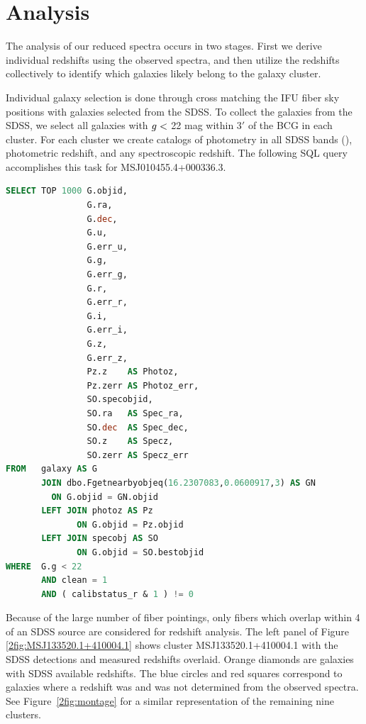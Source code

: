 \section{Analysis}\label{2sec:analysis} 
The analysis of our reduced spectra occurs in two stages. First we derive individual redshifts using the observed spectra, and then utilize the redshifts collectively to identify which galaxies likely belong to the galaxy cluster.

Individual galaxy selection is done through cross matching the IFU fiber sky positions with galaxies selected from the SDSS. To collect the galaxies from the SDSS, we select all galaxies with $\hbox{$g$} <$ 22 mag within $3'$ of the BCG in each cluster. For each cluster we create catalogs of photometry in all SDSS bands (\sdssu\sdssg\sdssr\sdssi\sdssz), photometric redshift, and any spectroscopic redshift. The following SQL query accomplishes this task for MSJ010455.4+000336.3.
\begin{singlespace}
\begin{lstlisting}[language=SQL]
SELECT TOP 1000 G.objid, 
                G.ra, 
                G.dec, 
                G.u, 
                G.err_u, 
                G.g, 
                G.err_g, 
                G.r, 
                G.err_r, 
                G.i, 
                G.err_i, 
                G.z, 
                G.err_z, 
                Pz.z    AS Photoz, 
                Pz.zerr AS Photoz_err, 
                SO.specobjid, 
                SO.ra   AS Spec_ra, 
                SO.dec  AS Spec_dec, 
                SO.z    AS Specz, 
                SO.zerr AS Specz_err 
FROM   galaxy AS G 
       JOIN dbo.Fgetnearbyobjeq(16.2307083,0.0600917,3) AS GN 
         ON G.objid = GN.objid 
       LEFT JOIN photoz AS Pz 
              ON G.objid = Pz.objid 
       LEFT JOIN specobj AS SO 
              ON G.objid = SO.bestobjid 
WHERE  G.g < 22 
       AND clean = 1 
       AND ( calibstatus_r & 1 ) != 0
\end{lstlisting}
\end{singlespace}

Because of the large number of fiber pointings, only fibers which overlap within 4 of an SDSS source are considered for redshift analysis. The left panel of Figure \ref{2fig:MSJ133520.1+410004.1} shows cluster MSJ133520.1+410004.1 with the SDSS detections and measured redshifts overlaid. Orange diamonds are galaxies with SDSS available redshifts. The blue circles and red squares correspond to galaxies where a redshift was and was not determined from the observed spectra. See Figure~\ref{2fig:montage} for a similar representation of the remaining nine clusters.


